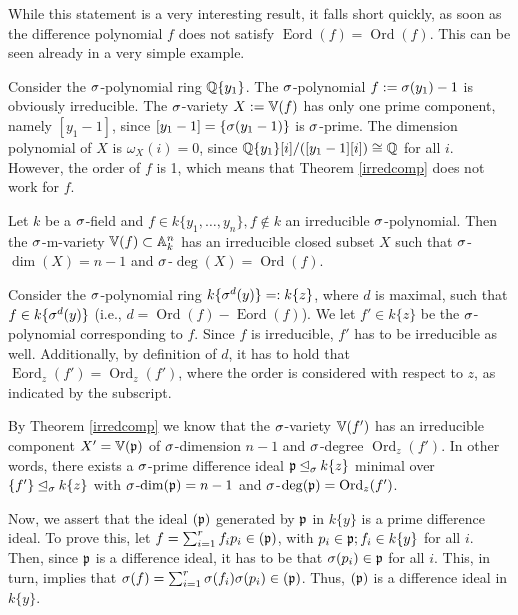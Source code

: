 While this statement is a very interesting result, it falls short quickly, as soon as the difference polynomial $f$ does not satisfy  $\operatorname{Eord}(f) = \operatorname{Ord}(f)$. This can be seen already in a very simple example.

\begin{ex}
Consider the $\sigma$-polynomial ring $\mathbb{Q}\{y_1\}$. The $\sigma$-polynomial $f := \sigma(y_1) - 1$ is obviously irreducible. The $\sigma$-variety $X:= \mathbb{V}(f)$ has only one prime component, namely $[y_1-1]$, since $[y_1-1] = \{ \sigma(y_1-1) \}$ is $\sigma$-prime.
The dimension polynomial of $X$ is $\omega_X(i) = 0$, since $\mathbb{Q}\{y_1\}[i]/([y_1 - 1][i]) \cong \mathbb{Q}$ for all $i$. However, the order of $f$ is 1, which means that Theorem \ref{irredcomp} does not work for $f$. 
\end{ex}

\begin{theorem}\label{corfinal}
Let $k$ be a $\sigma$-field and $f \in k\{y_1,\ldots,y_n\}, f \notin k$ an irreducible $\sigma$-polynomial. 
Then the $\sigma$-m-variety $\mathbb{V}(f) \subset \mathbb{A}_k^n$ has an irreducible closed subset $X$ such that $\sigma$-$\dim(X) = n-1$ and $\sigma$-$\operatorname{deg}(X) = \operatorname{Ord}(f)$.
\begin{bew}
Consider the $\sigma$-polynomial ring $k\{\sigma^d(y)\} =: k\{z\}$, where $d$ is maximal, such that $f \in k\{\sigma^d(y)\}$ (i.e., $d = \operatorname{Ord}(f) - \operatorname{Eord}(f)$). We let $f'\in k\{z\}$ be the $\sigma$-polynomial corresponding to $f$. 
Since $f$ is irreducible, $f'$ has to be irreducible as well. Additionally, by definition of $d$, it has to hold that $\operatorname{Eord}_z(f') = \operatorname{Ord}_z(f')$, where the order is considered with respect to $z$,
as indicated by the subscript. 

By Theorem \ref{irredcomp} we know that the $\sigma$-variety $ \mathbb{V}(f')$ has an irreducible component $X' = \mathbb{V}(\mathfrak{p})$ of $\sigma$-dimension $n-1$ and $\sigma$-degree $\operatorname{Ord}_z(f')$. In other words, there exists a $\sigma$-prime difference ideal $\mathfrak{p} \unlhd_{\sigma} k\{z\}$ minimal over $\{f'\} \unlhd_{\sigma} k\{z\}$ with
$\sigma$-$\dim(\mathfrak{p}) = n-1$ and $\sigma$-$\operatorname{deg}(\mathfrak{p}) = \operatorname{Ord}_z(f')$. 

Now, we assert that the ideal $(\mathfrak{p})$ generated by $\mathfrak{p}$ in $k\{y\}$ is a prime difference ideal. 
To prove this, let $f = \sum_{i=1}^r f_i p_i \in (\mathfrak{p})$, with $p_i \in \mathfrak{p}; f_i \in k\{y\}$ for all $i$. Then, since $\mathfrak{p}$ is a difference ideal, it has to be that $\sigma(p_i) \in \mathfrak{p}$ for all $i$.
This, in turn, implies that $\sigma(f) =  \sum_{i=1}^r \sigma(f_i) \sigma(p_i) \in (\mathfrak{p})$. Thus, $(\mathfrak{p})$ is a difference ideal in $k\{y\}$. 


\end{bew}
\end{theorem}
